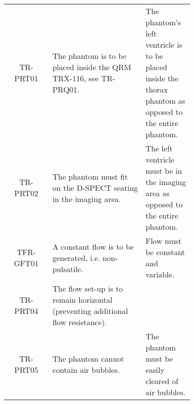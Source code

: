 {\begin{longtable}{|c|p{0.5\linewidth}|p{0.26\linewidth}|}
	TR-PRT01 & The phantom is to be placed inside the QRM TRX-116, see TR-PRQ01. & The phantom's left ventricle is to be placed inside the thorax phantom as opposed to the entire phantom.\\
	TR-PRT02 & The phantom must fit on the D-SPECT seating in the imaging area. & The left ventricle must be in the imaging area as opposed to the entire phantom.\\
	TFR-GFT01 & A constant flow is to be generated, i.e. non-pulsatile. & Flow must be constant and variable.\\
	TR-PRT04 			& The flow set-up is to remain horizontal (preventing additional flow resistance). \\
	TR-PRT05 			& The phantom cannot contain air bubbles. & The phantom must be easily cleared of air bubbles. \\
		\hline
	\end{longtable}
}

\normalsize
